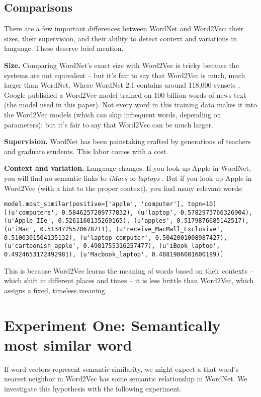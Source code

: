 \documentclass{article}
\begin{document}
\subsection{Comparisons}

There are a few important differences between WordNet and Word2Vec: their sizes, their supervision, and their ability to detect context and variations in language. These deserve brief mention.

\textbf{Size.} Comparing WordNet's exact size with Word2Vec is tricky because the systems are not equivalent -- but it's fair to say that Word2Vec is much, much larger than WordNet. Where WordNet 2.1 contains around 118,000 synsets \cite{wordnet}, Google published a Word2Vec model trained on 100 billion words \cite{Word2VecWebsite} of news text (the model used in this paper). Not every word in this training data makes it into the Word2Vec models (which can skip infrequent words, depending on parameters): but it's fair to say that Word2Vec can be much larger. 

\textbf{Supervision.} WordNet has been painstaking crafted by generations of teachers and graduate students. This labor comes with a cost.

\textbf{Context and variation.} Language changes. If you look up Apple in WordNet, you will find no semantic links to \textit{iMacs} or \textit{laptops} \cite{widdows}. But if you look up Apple in Word2Vec (with a hint to the proper context), you find many relevant words: 

\begin{lstlisting}
model.most_similar(positive=['apple', 'computer'], topn=10)
[(u'computers', 0.5846257209777832), (u'laptop', 0.5782973766326904), (u'Apple_IIe', 0.5261160135269165), (u'apples', 0.5179876685142517), (u'iMac', 0.5134725570678711), (u'receive_MacMall_Exclusive', 0.5100301504135132), (u'laptop_computer', 0.5042001008987427), (u'cartoonish_apple', 0.4981755316257477), (u'iBook_laptop', 0.4924653172492981), (u'Macbook_laptop', 0.4881986081600189)]
\end{lstlisting}

This is because Word2Vec learns the meaning of words based on their contexts -- which shift in different places and times -- it is less brittle than Word2Vec, which assigns a fixed, timeless meaning. 

\section{Experiment One: Semantically most similar word}
If word vectors represent semantic similarity, we might expect a that word's nearest neighbor in Word2Vec has some semantic relationship in WordNet. We investigate this hypothesis with the following experiment. 
\end{document}

